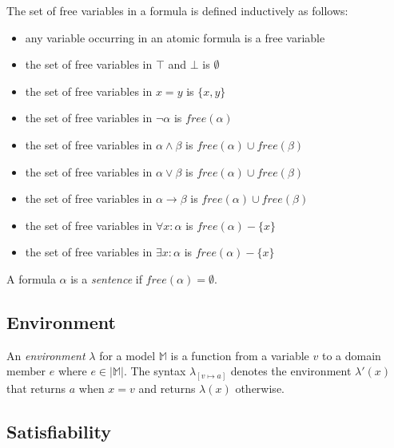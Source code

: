 		The set of free variables in a formula is defined inductively as follows:
		\begin{itemize}
		\item any variable occurring in an atomic formula is a free variable
		\item the set of free variables in $\top$ and $\bot$ is $\emptyset$
		\item the set of free variables in $x = y$ is $\{x,y\}$
		\item the set of free variables in $\neg\alpha$ is $free(\alpha)$
		\item the set of free variables in $\alpha \wedge \beta$ is $free(\alpha) \cup free(\beta)$
		\item the set of free variables in $\alpha \vee   \beta$ is $free(\alpha) \cup free(\beta)$
		\item the set of free variables in $\alpha \to    \beta$ is $free(\alpha) \cup free(\beta)$
		\item the set of free variables in $\forall x : \alpha$ is $free(\alpha) - \{x\}$
		\item the set of free variables in $\exists x : \alpha$ is $free(\alpha) - \{x\}$
		\end{itemize}
		A formula $\alpha$ is a \emph{sentence} if $free(\alpha) = \emptyset$.

	\subsection{Environment}

		An \emph{environment} $\lambda$ for a model $\mathbb{M}$ is a function
		from a variable $v$ to a domain member $e$ where $e \in |\mathbb{M}|$.
		The syntax $\lambda_{[v \mapsto a]}$ denotes the environment
		$\lambda'(x)$ that returns $a$ when $x=v$ and returns $\lambda(x)$
		otherwise.

	\subsection{Satisfiability}


